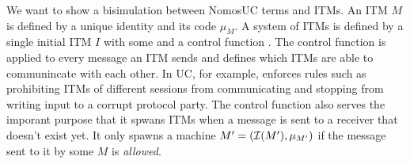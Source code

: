 %

We want to show a bisimulation between NomosUC terms and ITMs.
An ITM $M$ is defined by a unique identity  and its code $\mu_M$. 
A system of ITMs is defined by a single initial ITM $I$ with some  and a control function \cf.
The control function is applied to every message an ITM sends and defines which ITMs are able to communincate with each other.
In UC, for example, \cf enforces rules such as prohibiting ITMs of different sessions from communicating and stopping \Z from writing input to a corrupt protocol party. 
The control function also serves the imporant purpose that it spwans ITMs when a message is sent to a receiver that doesn't exist yet. It only spawns a machine $M' = (\mathcal{I}(M'), \mu_{M'})$ if the message sent to it by some $M$ is \emph{allowed}.

